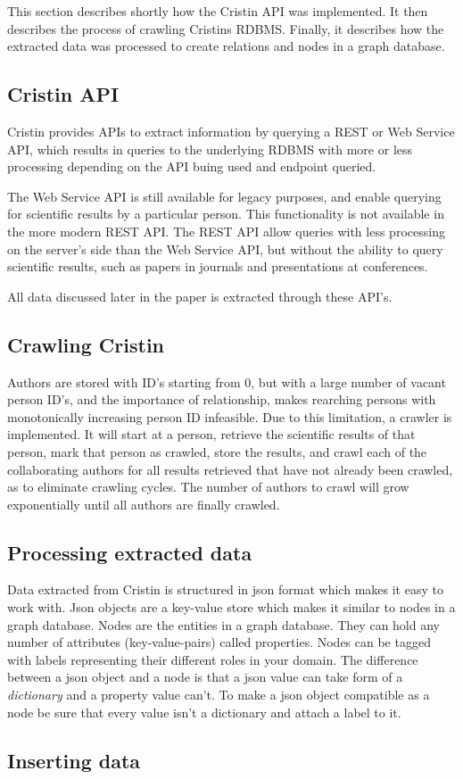 This section describes shortly how the Cristin API was implemented. It then describes the process of crawling Cristins RDBMS. Finally, it describes how the extracted data was processed to create relations and nodes in a graph database.

\subsection*{Cristin API}
Cristin provides APIs to extract information by querying a REST or Web Service API, which results in queries to the underlying RDBMS with more or less processing depending on the API buing used and endpoint queried\cite{CRISTIN-API-summary}.

The Web Service API\cite{CRISTIN-WS} is still available for legacy purposes, and enable querying for scientific results by a particular person. This functionality is not available in the more modern REST API. The REST API\cite{CRISTIN-REST} allow queries with less processing on the server's side than the Web Service API, but without the ability to query scientific results, such as papers in journals and presentations at conferences.

All data discussed later in the paper is extracted through these API's.

\subsection*{Crawling Cristin}
Authors are stored with ID's starting from 0, but with a large number of vacant person ID's, and the importance of relationship, makes rearching persons with monotonically increasing person ID infeasible.
Due to this limitation, a crawler is implemented. It will start at a person, retrieve the scientific results of that person, mark that person as crawled, store the results, and crawl each of the collaborating authors for all results retrieved that have not already been crawled, as to eliminate crawling cycles.
The number of authors to crawl will grow exponentially until all authors are finally crawled.

\subsection*{Processing extracted data}
Data extracted from Cristin is structured in json format which makes it easy to work with. Json objects are a key-value store which makes it similar to nodes in a graph database. Nodes are the entities in a graph database. They can hold any number of attributes (key-value-pairs) called properties. Nodes can be tagged with labels representing their different roles in your domain.\cite{neo4j} The difference between a json object and a node is that a json value can take form of a \textit{dictionary} and a property value can't. To make a json object compatible as a node be sure that every value isn't a dictionary and attach a label to it.





\subsection*{Inserting data}
